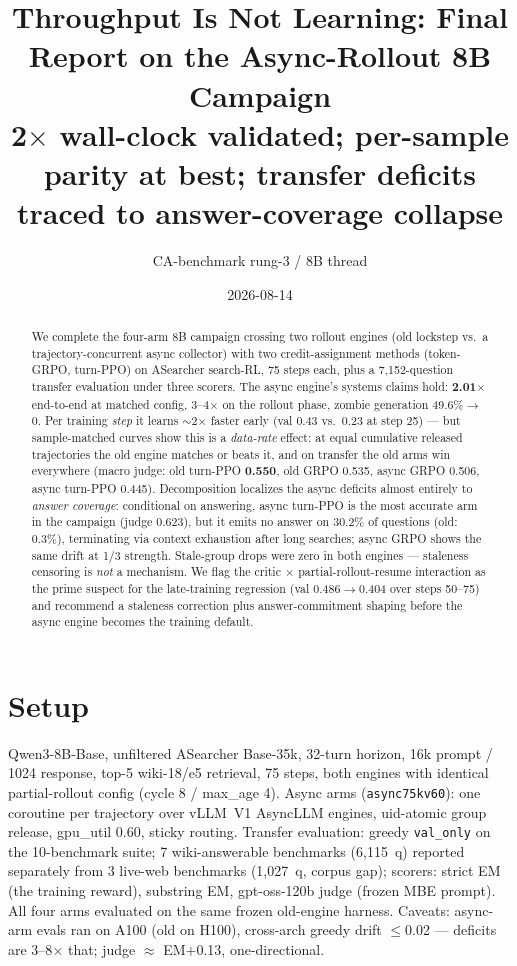 \documentclass[10pt]{article}
\title{\vspace{-1.2em}Throughput Is Not Learning: Final Report on the Async-Rollout
8B Campaign\\ \large 2$\times$ wall-clock validated; per-sample parity at best; transfer
deficits traced to answer-coverage collapse}
\author{CA-benchmark rung-3 / 8B thread}
\date{2026-08-14}
\newcommand{\hw}[1]{\textbf{#1}}
\begin{document}
\maketitle
\vspace{-2em}

\begin{abstract}
We complete the four-arm 8B campaign crossing two rollout engines (old lockstep vs.\ a
trajectory-concurrent async collector) with two credit-assignment methods (token-GRPO,
turn-PPO) on ASearcher search-RL, 75 steps each, plus a 7{,}152-question transfer
evaluation under three scorers. The async engine's systems claims hold: \hw{2.01$\times$}
end-to-end at matched config, 3--4$\times$ on the rollout phase, zombie generation
49.6\%$\rightarrow$0. Per training \emph{step} it learns $\sim$2$\times$ faster early (val
0.43 vs.\ 0.23 at step 25) --- but sample-matched curves show this is a \emph{data-rate}
effect: at equal cumulative released trajectories the old engine matches or beats it, and
on transfer the old arms win everywhere (macro judge: old turn-PPO \hw{0.550}, old GRPO
0.535, async GRPO 0.506, async turn-PPO 0.445). Decomposition localizes the async deficits
almost entirely to \emph{answer coverage}: conditional on answering, async turn-PPO is the
most accurate arm in the campaign (judge 0.623), but it emits no answer on 30.2\% of
questions (old: 0.3\%), terminating via context exhaustion after long searches; async GRPO
shows the same drift at 1/3 strength. Stale-group drops were zero in both engines ---
staleness censoring is \emph{not} a mechanism. We flag the critic $\times$
partial-rollout-resume interaction as the prime suspect for the late-training regression
(val 0.486$\rightarrow$0.404 over steps 50--75) and recommend a staleness correction plus
answer-commitment shaping before the async engine becomes the training default.
\end{abstract}

\section*{Setup}
Qwen3-8B-Base, unfiltered ASearcher Base-35k, 32-turn horizon, 16k prompt / 1024 response,
top-5 wiki-18/e5 retrieval, 75 steps, both engines with identical partial-rollout config
(cycle 8 / max\_age 4). Async arms (\texttt{async75kv60}): one coroutine per trajectory over
vLLM~V1 AsyncLLM engines, uid-atomic group release, gpu\_util 0.60, sticky routing. Transfer
evaluation: greedy \texttt{val\_only} on the 10-benchmark suite; 7 wiki-answerable
benchmarks (6{,}115~q) reported separately from 3 live-web benchmarks (1{,}027~q, corpus
gap); scorers: strict EM (the training reward), substring EM, gpt-oss-120b judge (frozen
MBE prompt). All four arms evaluated on the same frozen old-engine harness. Caveats:
async-arm evals ran on A100 (old on H100), cross-arch greedy drift $\le$0.02 --- deficits
are 3--8$\times$ that; judge $\approx$ EM$+$0.13, one-directional.
\end{document}
